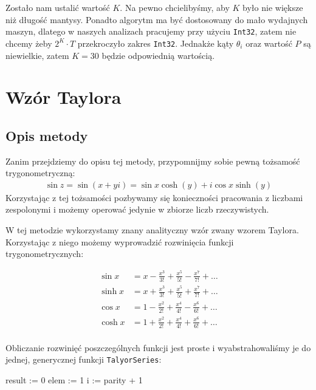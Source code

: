 \documentclass[12pt]{extarticle}
\theoremstyle{remark}
\theoremstyle{definition}
\theoremstyle{definition}
\begin{document}
Zostało nam ustalić wartość $K$. Na pewno chcielibyśmy, aby $K$ było nie większe niż
długość mantysy. Ponadto algorytm ma być dostosowany do mało wydajnych maszyn, dlatego
w naszych analizach pracujemy przy użyciu \texttt{Int32}, zatem nie chcemy żeby $2^K\cdot T$ przekroczyło
zakres \texttt{Int32}. Jednakże kąty $\theta_i$ oraz wartość $P$ są niewielkie, zatem $K = 30$ będzie
odpowiednią wartością.

\section{Wzór Taylora}
\subsection{Opis metody}
Zanim przejdziemy do opisu tej metody, przypomnijmy sobie pewną tożsamość trygonometryczną:
\begin{align}
  \sin z = \sin (x + yi) = \sin x\cosh (y) + i\cos x\sinh(y) 
\end{align}
Korzystając z tej tożsamości pozbywamy się konieczności pracowania z liczbami zespolonymi i możemy operować jedynie w zbiorze liczb rzeczywistych.

W tej metodzie wykorzystamy znany analityczny wzór zwany wzorem Taylora. Korzystając z niego możemy wyprowadzić rozwinięcia funkcji trygonometrycznych:

\begin{align*}
  \sin x  & = x - \frac{x^3}{3!} + \frac{x^5}{5!} - \frac{x^7}{7!} + \ldots \\
  \sinh x & = x + \frac{x^3}{3!} + \frac{x^5}{5!} + \frac{x^7}{7!} + \ldots \\
  \cos x  & = 1 - \frac{x^2}{2!} + \frac{x^4}{4!} - \frac{x^6}{6!} + \ldots \\
  \cosh x & = 1 + \frac{x^2}{2!} + \frac{x^4}{4!} + \frac{x^6}{6!} + \ldots \\
\end{align*}

Obliczanie rozwinięć poszczególnych funkcji jest proste i wyabstrahowaliśmy je do jednej, generycznej funkcji \texttt{TalyorSeries}:
\begin{center}
  \begin{algorithm}[H]
    \SetAlgoLined
    result := 0\;
    elem := 1\;
    i := parity + 1\;
  \end{algorithm}
\end{center}
\end{document}
